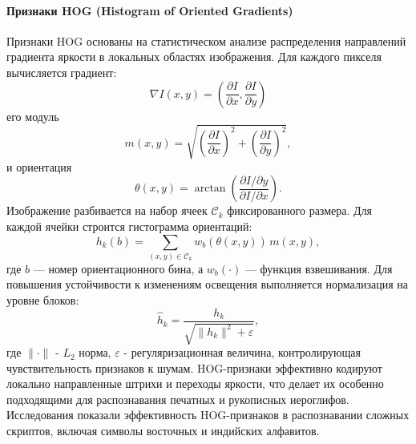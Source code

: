 \paragraph{Признаки HOG (Histogram of Oriented Gradients)} Признаки HOG \cite{meygret1992robust} основаны на статистическом анализе распределения направлений градиента яркости в локальных областях изображения. Для каждого пикселя вычисляется градиент:
\[
    \nabla I(x,y) =
    \left(
    \frac{\partial I}{\partial x},
    \frac{\partial I}{\partial y}
    \right)
\]
его модуль
\[
    m(x,y) =
    \sqrt{
        \left(\frac{\partial I}{\partial x}\right)^2
        +
        \left(\frac{\partial I}{\partial y}\right)^2
    },
\]
и ориентация
\[
    \theta(x,y) =
    \arctan\left(
    \frac{\partial I / \partial y}
    {\partial I / \partial x}
    \right).
\]
Изображение разбивается на набор ячеек ${\mathcal{C}_k}$ фиксированного размера. Для каждой ячейки строится гистограмма ориентаций:
\[
    h_k(b) =
    \sum_{(x,y) \in \mathcal{C}_k}
    w_b\!\left(\theta(x,y)\right)
    \, m(x,y),
\]
где $b$ — номер ориентационного бина, а $w_b(\cdot)$ — функция взвешивания. Для повышения устойчивости к изменениям освещения выполняется нормализация на уровне блоков:
\[
    \hat{h}_k =
    \frac{h_k}
    {\sqrt{\|h_k\|^2 + \varepsilon}},
\]
где \(\|\cdot\|\) - $L_2$ норма, \(\varepsilon\) - регуляризационная величина, контролирующая чувствительность признаков к шумам. HOG-признаки эффективно кодируют локально направленные штрихи и переходы яркости, что делает их особенно подходящими для распознавания печатных и рукописных иероглифов. Исследования \cite{tian2016multilingual, deore2019histogram} показали эффективность HOG-признаков в распознавании сложных скриптов, включая символы восточных и индийских алфавитов.

